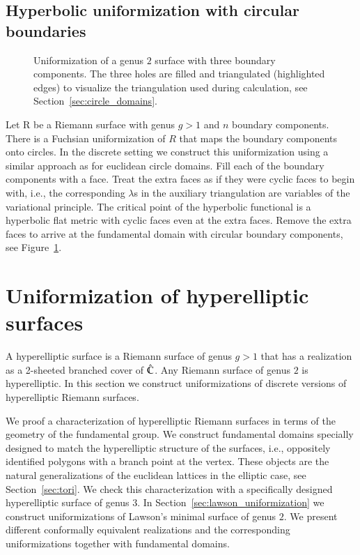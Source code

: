 \documentclass[Thesis]{subfiles}
\begin{document}
\subsection{Hyperbolic uniformization with circular boundaries}
\label{sec:hyperbolic_circle_domain}

\begin{figure}
\centering
{}
\caption{
Uniformization of a genus $2$ surface with three boundary components. 
The three holes are filled and triangulated (highlighted edges) to visualize the triangulation used during calculation, see Section~\ref{sec:circle_domains}.
}
\label{fig:hyperbolic_circle_domain}
\end{figure}

Let R be a Riemann surface with genus $g>1$ and $n$ boundary components.
There is a Fuchsian uniformization of $R$ that maps the boundary components onto circles. 
In the discrete setting we construct this uniformization using a similar approach as for euclidean circle domains.
Fill each of the boundary components with a face.
Treat the extra faces as if they were cyclic faces to begin with, i.e., the corresponding $\lambda$s in the auxiliary triangulation are variables of the variational principle.
The critical point of the hyperbolic functional is a hyperbolic flat metric with cyclic faces even at the extra faces.
Remove the extra faces to arrive at the fundamental domain with circular boundary components, see Figure~\ref{fig:hyperbolic_circle_domain}.


\section{Uniformization of hyperelliptic surfaces}
\label{sec:hyperelliptic}

A hyperelliptic surface is a Riemann surface of genus $g>1$ that has a realization as a 2-sheeted branched cover of $\hat{\mathbb C}$.
Any Riemann surface of genus $2$ is hyperelliptic.
In this section we construct uniformizations of discrete versions of hyperelliptic Riemann surfaces.

We proof a characterization of hyperelliptic Riemann surfaces in terms of the geometry of the fundamental group. 
We construct fundamental domains specially designed to match the hyperelliptic structure of the surfaces, i.e., oppositely identified polygons with a branch point at the vertex.
These objects are the natural generalizations of the euclidean lattices in the elliptic case, see Section~\ref{sec:tori}.
We check this characterization with a specifically designed hyperelliptic surface of genus $3$.
In Section~\ref{sec:lawson_uniformization} we construct uniformizations of Lawson's minimal surface of genus $2$. We present different conformally equivalent realizations and the corresponding uniformizations together with fundamental domains.
\end{document}
